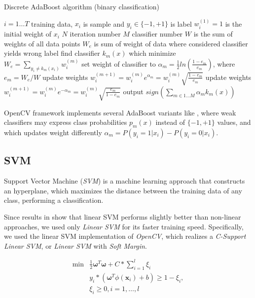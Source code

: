 \begin{algorithm}
\caption{Discrete AdaBoost algorithm (binary classification)} 
\label{alg:adaboost}
\begin{algorithmic}
\STATE $i=1 \ldots T$ training data, $x_i$ is sample and $y_i \in \{-1,+1\}$ is label
\STATE $w_{i}^{(1)}=1$ is the initial weight of $x_i$
\STATE $N$ iteration number
\STATE $M$ classifier number
\STATE $W$ is the sum of weights of all data points
\STATE $W_e$ is sum of weight of data where considered classifier yields wrong label
		\STATE find classifier $k_{m}(x)$ which minimize $W_e=\sum_{y_i \neq k_m(x_i)}{w_{i}^{(m)}}$
		\STATE set weight of classifier to $\alpha_{m}=\frac{1}{2}ln(\frac{1-e_m}{e_m}) $, where $e_m=W_e/W$
	 		\STATE update weights $w_{i}^{(m+1)}=w_{i}^{(m)}e^{\alpha_m}=w_{i}^{(m)}\sqrt{\frac{1-e_m}{e_m}}$
		\ELSE
			\STATE update weights $w_{i}^{(m+1)}=w_{i}^{(m)}e^{-\alpha_m}=w_{i}^{(m)}\sqrt{\frac{e_m}{1-e_m}}$
 		\ENDIF
\STATE output $sign( \sum_{m \in 1 \ldots M}{ \alpha_m k_m (x)} )$
\ENDFOR
\end{algorithmic}
\end{algorithm}

OpenCV framework implements several AdaBoost variants like , where weak classifiers may express class probabilities $p_m(x)$ instead of $\{-1,+1\}$ values, and  which updates weight differently $\alpha_{m}=P(y_i=1|x_i)-P(y_i=0|x_i)$. 


\subsection{SVM}

Support Vector Machine (\emph{SVM}) is a machine learning approach that
 constructs an hyperplane, which maximizes the distance between the training
 data of any class, performing a classification.
 
 Since results in \cite{Littlewort04dynamicsof} show that linear SVM performs
 slightly better than non-linear approaches, we used only \emph{Linear SVM} for
 its faster training speed. Specifically, we used the linear SVM implementation
 of \emph{OpenCV}, which realizes a \emph{C-Support Linear SVM}, or \emph{Linear
 SVM} with \emph{Soft Margin}.
 
 \begin{align}
   \min & \frac{1}{2} \boldsymbol{\omega}^T \boldsymbol{\omega} + C*\sum_{i=1}^l \xi_i\\
   & y_i * (\boldsymbol{\omega}^T \phi(\textbf{x}_i) + b) \geq 1 - \xi_i,\\
   & \xi_i \geq 0, i = 1, \dots, l
   \label{mt:lin_svm}
 \end{align}
 
